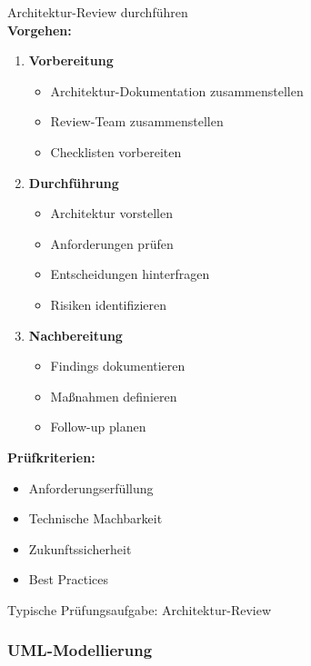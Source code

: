\begin{KR}{Architektur-Review durchführen}\\
\textbf{Vorgehen:}
\begin{enumerate}
    \item \textbf{Vorbereitung}
    \begin{itemize}
        \item Architektur-Dokumentation zusammenstellen
        \item Review-Team zusammenstellen
        \item Checklisten vorbereiten
    \end{itemize}
    
    \item \textbf{Durchführung}
    \begin{itemize}
        \item Architektur vorstellen
        \item Anforderungen prüfen
        \item Entscheidungen hinterfragen
        \item Risiken identifizieren
    \end{itemize}
    
    \item \textbf{Nachbereitung}
    \begin{itemize}
        \item Findings dokumentieren
        \item Maßnahmen definieren
        \item Follow-up planen
    \end{itemize}
\end{enumerate}

\textbf{Prüfkriterien:}
\begin{itemize}
    \item Anforderungserfüllung
    \item Technische Machbarkeit
    \item Zukunftssicherheit
    \item Best Practices
\end{itemize}
\end{KR}

\begin{example2}{Typische Prüfungsaufgabe: Architektur-Review}\\
\end{example2}


\subsubsection{UML-Modellierung}

